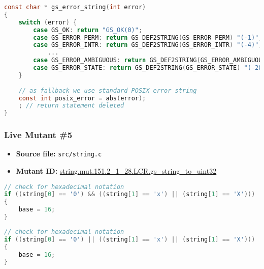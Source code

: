 \begin{lstlisting}[language=C, label=live_4, caption=Mutant source code.]
const char * gs_error_string(int error)
{
    switch (error) {
        case GS_OK: return "GS_OK(0)";
        case GS_ERROR_PERM: return GS_DEF2STRING(GS_ERROR_PERM) "(-1)";
        case GS_ERROR_INTR: return GS_DEF2STRING(GS_ERROR_INTR) "(-4)";
            ...
        case GS_ERROR_AMBIGUOUS: return GS_DEF2STRING(GS_ERROR_AMBIGUOUS) "(-2009)";
        case GS_ERROR_STATE: return GS_DEF2STRING(GS_ERROR_STATE) "(-2010)";
    }
   
    // as fallback we use standard POSIX error string
    const int posix_error = abs(error);
    ; // return statement deleted
}
\end{lstlisting}



\subsubsection{Live Mutant \#5}

\begin{itemize}
\item \textbf{Source file:} \texttt{src/string.c}
\item \textbf{Mutant ID:} \url{string.mut.151.2_1_28.LCR.gs_string_to_uint32}
\end{itemize}

\begin{lstlisting}[language=C, label=live_5, caption=Original source code.]
 // check for hexadecimal notation
if ((string[0] == '0') && ((string[1] == 'x') || (string[1] == 'X')))                                                             
{
    base = 16;
}
\end{lstlisting}

\begin{lstlisting}[language=C, label=live_5, caption=Mutant source code.]
// check for hexadecimal notation
if ((string[0] == '0') || ((string[1] == 'x') || (string[1] == 'X')))                                                              
{
    base = 16;
}
\end{lstlisting}






